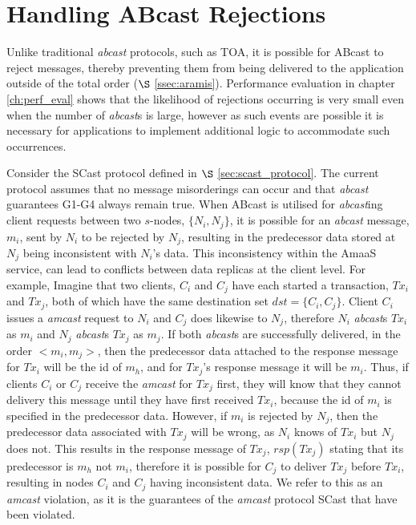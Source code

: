 \section{Handling ABcast Rejections}
 Unlike traditional \emph{abcast} protocols, such as TOA, it is possible for \textsf{ABcast} to reject messages, thereby preventing them from being delivered to the application outside of the total order ($\S$ \ref{ssec:aramis}).  Performance evaluation in chapter \ref{ch:perf_eval} shows that the likelihood of rejections occurring is very small even when the number of \emph{abcast}s is large, however as such events are possible it is necessary for applications to implement additional logic to accommodate such occurrences.  
 
Consider the \textsf{SCast} protocol defined in $\S$ \ref{sec:scast_protocol}.  The current protocol assumes that no message misorderings can occur and that \emph{abcast} guarantees G1-G4 always remain true.  When \textsf{ABcast} is utilised for \emph{abcast}ing client requests between two $s$-nodes, $\{N_i, N_j\}$, it is possible for an \emph{abcast} message, $m_i$, sent by $N_i$ to be rejected by $N_j$, resulting in the predecessor data stored at $N_j$ being inconsistent with $N_i$'s data.  This inconsistency within the \textsf{AmaaS} service, can lead to conflicts between data replicas at the client level.  For example, Imagine that two clients, $C_i$ and $C_j$ have each started a transaction, $Tx_i$ and $Tx_j$, both of which have the same destination set $dst=\{C_i, C_j\}$.  Client $C_i$ issues a \emph{amcast} request to $N_i$ and $C_j$ does likewise to $N_j$, therefore $N_i$ \emph{abcast}s $Tx_i$ as $m_i$ and $N_j$ \emph{abcast}s $Tx_j$ as $m_j$.  If both \emph{abcast}s are successfully delivered, in the order $<m_i, m_j>$, then the predecessor data attached to the response message for $Tx_i$ will be the id of $m_h$, and for $Tx_j$'s response message it will be $m_i$.  Thus, if clients $C_i$ or $C_j$ receive the \emph{amcast} for $Tx_j$ first, they will know that they cannot delivery this message until they have first received $Tx_i$, because the id of $m_i$ is specified in the predecessor data.  However, if $m_i$ is rejected by $N_j$, then the predecessor data associated with $Tx_j$ will be wrong, as $N_i$ knows of $Tx_i$ but $N_j$ does not.  This results in the response message of $Tx_j$, $rsp(Tx_j)$ stating that its predecessor is $m_h$ not $m_i$, therefore it is possible for $C_j$ to deliver $Tx_j$ before $Tx_i$, resulting in nodes $C_i$ and $C_j$ having inconsistent data.  We refer to this as an \emph{amcast} violation, as it is the guarantees of the \emph{amcast} protocol \textsf{SCast} that have been violated.  

